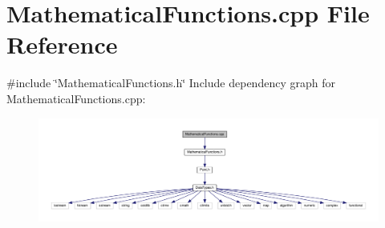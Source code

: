 \section{Mathematical\+Functions.\+cpp File Reference}
\label{_mathematical_functions_8cpp}
{\ttfamily \#include \char`\"{}Mathematical\+Functions.\+h\char`\"{}}\newline
Include dependency graph for Mathematical\+Functions.\+cpp\+:\nopagebreak
\begin{figure}[H]
\begin{center}
\leavevmode
\includegraphics[width=350pt]{_mathematical_functions_8cpp__incl}
\end{center}
\end{figure}
